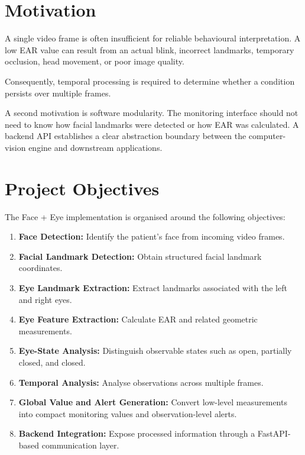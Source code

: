 \documentclass{tietreport}
\begin{document}

\section{Motivation}

A single video frame is often insufficient for reliable behavioural
interpretation. A low EAR value can result from an actual blink,
incorrect landmarks, temporary occlusion, head movement, or poor image
quality.

Consequently, temporal processing is required to determine whether a
condition persists over multiple frames.

A second motivation is software modularity. The monitoring interface
should not need to know how facial landmarks were detected or how EAR
was calculated. A backend API establishes a clear abstraction boundary
between the computer-vision engine and downstream applications.


\section{Project Objectives}

The Face + Eye implementation is organised around the following
objectives:

\begin{enumerate}

    \item \textbf{Face Detection:}
    Identify the patient's face from incoming video frames.

    \item \textbf{Facial Landmark Detection:}
    Obtain structured facial landmark coordinates.

    \item \textbf{Eye Landmark Extraction:}
    Extract landmarks associated with the left and right eyes.

    \item \textbf{Eye Feature Extraction:}
    Calculate EAR and related geometric measurements.

    \item \textbf{Eye-State Analysis:}
    Distinguish observable states such as open, partially closed,
    and closed.

    \item \textbf{Temporal Analysis:}
    Analyse observations across multiple frames.

    \item \textbf{Global Value and Alert Generation:}
    Convert low-level measurements into compact monitoring values and
    observation-level alerts.

    \item \textbf{Backend Integration:}
    Expose processed information through a FastAPI-based
    communication layer.

\end{enumerate}
\end{document}
